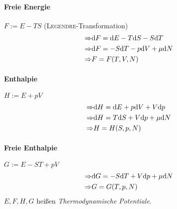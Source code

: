 \paragraph{Freie Energie} $F:=E - TS$ (\textsc{Legendre}-Transformation)
\begin{equation}
    \begin{split}
        \Rightarrow & \mathrm{d} F = \mathrm{d} E - T \mathrm{d} S - S \mathrm{d} T \\
        \Rightarrow & \mathrm{d} F = -S\mathrm{d} T - p \mathrm{d} V + \mu \mathrm{d} N \\
        \Rightarrow & F=F(T, V, N)
    \end{split}
\end{equation}
\paragraph{Enthalpie} $H:=E+pV$
\begin{equation}
    \begin{split}
        \Rightarrow & \mathrm{d} H = \mathrm{d} E + p \mathrm{d} V + V \mathrm{d} p \\
        \Rightarrow & \mathrm{d} H = T \mathrm{d} S + V \mathrm{d} p + \mu \mathrm{d} N \\
        \Rightarrow & H=H(S, p, N)
    \end{split}
\end{equation}
\paragraph{Freie Enthalpie} $G:=E-ST+pV$
\begin{equation}
    \begin{split}
        \Rightarrow & \mathrm{d} G = - S \mathrm{d} T + V \mathrm{d} p + \mu \mathrm{d} N \\
        \Rightarrow & G=G(T, p, N)
    \end{split}
\end{equation}
$E, F, H, G$ heißen \emph{Thermodynamische Potentiale}.
